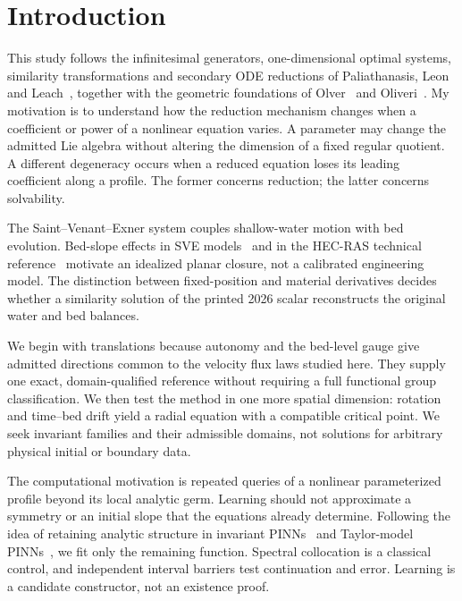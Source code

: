 \documentclass[12pt,a4paper,oneside]{report}
\numberwithin{equation}{chapter}
\theoremstyle{definition}
\theoremstyle{remark}\newtheorem{remark}[theorem]{Remark}
\newif\ifreviewmarks
\DeclareRobustCommand{\review}[1]{{\ifreviewmarks\color{authorblue}\fi #1}}
\begin{document}
\chapter{Introduction}\label{ch:introduction}
\review{This study follows the infinitesimal generators, one-dimensional optimal systems, similarity transformations and secondary ODE reductions of Paliathanasis, Leon and Leach~\cite{sve2026}, together with the geometric foundations of Olver~\cite{olver} and Oliveri~\cite{oliveri}. My motivation is to understand how the reduction mechanism changes when a coefficient or power of a nonlinear equation varies. A parameter may change the admitted Lie algebra without altering the dimension of a fixed regular quotient. A different degeneracy occurs when a reduced equation loses its leading coefficient along a profile. The former concerns reduction; the latter concerns solvability.}

\review{The Saint--Venant--Exner system couples shallow-water motion with bed evolution. Bed-slope effects in SVE models~\cite{fernandez2017} and in the HEC-RAS technical reference~\cite[Sec.~2.9]{hecras2019} motivate an idealized planar closure, not a calibrated engineering model. The distinction between fixed-position and material derivatives decides whether a similarity solution of the printed 2026 scalar reconstructs the original water and bed balances.}

\review{We begin with translations because autonomy and the bed-level gauge give admitted directions common to the velocity flux laws studied here. They supply one exact, domain-qualified reference without requiring a full functional group classification. We then test the method in one more spatial dimension: rotation and time--bed drift yield a radial equation with a compatible critical point. We seek invariant families and their admissible domains, not solutions for arbitrary physical initial or boundary data.}

\review{The computational motivation is repeated queries of a nonlinear parameterized profile beyond its local analytic germ. Learning should not approximate a symmetry or an initial slope that the equations already determine. Following the idea of retaining analytic structure in invariant PINNs~\cite{arora2023} and Taylor-model PINNs~\cite{nagesh2025}, we fit only the remaining function. Spectral collocation is a classical control, and independent interval barriers test continuation and error. Learning is a candidate constructor, not an existence proof.}
\end{document}
